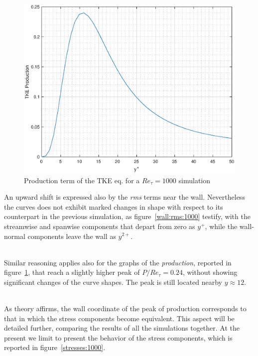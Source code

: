 \begin{figure}
\begin{center}
\includegraphics[scale=0.55]{grafici/tke_prod_1000.eps}
\caption{Production term of the TKE eq. for a $Re_{\tau}=1000$ simulation}
\label{tke:prod:1000}
\end{center} 
\end{figure}

An upward shift is expressed also by the \emph{rms} terms near the wall. Nevertheless the curves does not exhibit marked changes in shape with respect to its counterpart in the previous simulation, as figure~\ref{wall:rms:1000} testify, with the streamwise and spanwise components that depart from zero as $y^{+}$, while the wall-normal components leave the wall as $y^{2+}$. \\~\par

Similar reasoning applies also for the graphs of the \emph{production}, reported in figure~\ref{tke:prod:1000}, that reach a slightly higher peak of $P/Re_{\tau}=0.24$, without showing significant changes of the curve shapes. The peak is still located nearby $y\approx 12$.\\~\par

As theory affirms, the wall coordinate of the peak of production corresponds to that in which the stress components become equivalent. This aspect will be detailed further, comparing the results of all the simulations together.
At the present we limit to present the behavior of the stress components, which is reported in figure~\ref{stresses:1000}.

